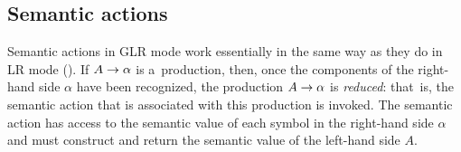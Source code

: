 

\subsection{Semantic actions}
\label{sec:GLR:actions}

Semantic actions in GLR mode work essentially in the same way as they do in LR
mode (). If $A \rightarrow \alpha$ is a~production, then,
once the components of the right-hand side $\alpha$ have been recognized, the
production $A \rightarrow \alpha$ is \emph{reduced}: that~is, the semantic
action that is associated with this production is invoked. The semantic action
has access to the semantic value of each symbol in the right-hand side
$\alpha$ and must construct and return the semantic value of the left-hand
side $A$.

